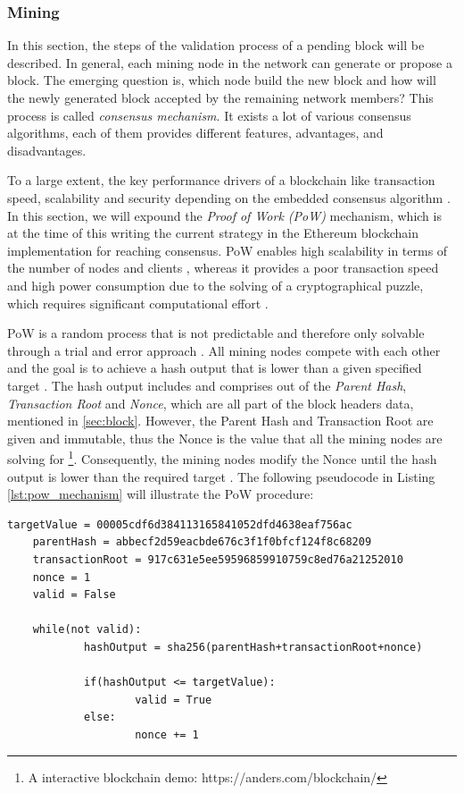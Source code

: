 \subsubsection{Mining}
\label{sec:mining}
In this section, the steps of the validation process of a pending block will be described. 
In general, each mining node in the network can generate or propose a block. 
The emerging question is, which node build the new block and how will the newly 
generated block accepted by the remaining network members? 
This process is called \textit{consensus mechanism}.
It exists a lot of various consensus algorithms, each of them provides different features,
advantages, and disadvantages. 

To a large extent, the key performance drivers of a blockchain
like transaction speed, scalability and security depending on the embedded consensus algorithm . 
In this section, we will expound the \textit{Proof of Work (PoW)} mechanism, 
which is at the time of this writing the current strategy in the Ethereum blockchain 
implementation for reaching consensus. 
PoW enables high scalability in terms of the number 
of nodes and clients , whereas it provides a poor transaction speed and high 
power consumption due to the solving of a cryptographical puzzle, which requires 
significant computational effort . 

PoW is a random process that is not predictable and therefore only solvable through a 
trial and error approach . 
All mining nodes compete with each other and the goal is to achieve a hash output that 
is lower than a given specified target .
The hash output includes and comprises out of the \textit{Parent Hash}, \textit{Transaction Root} and
\textit{Nonce}, which are all part of the block headers data, mentioned in \ref{sec:block}.
However, the Parent Hash and Transaction Root are given and immutable, thus the Nonce
is the value that all the mining nodes are solving for \footnote{A interactive blockchain demo: https://anders.com/blockchain/}.
Consequently, the mining nodes modify the Nonce until the hash output is lower than the required target .
The following pseudocode in Listing \ref{lst:pow_mechanism} will illustrate the PoW procedure:

\vspace{7mm}
\begin{lstlisting}[label={lst:pow_mechanism}, caption={Pseudocode of PoW Mechanism}]
	targetValue = 00005cdf6d384113165841052dfd4638eaf756ac
	parentHash = abbecf2d59eacbde676c3f1f0bfcf124f8c68209
	transactionRoot = 917c631e5ee59596859910759c8ed76a21252010
	nonce = 1
	valid = False

	while(not valid):
			hashOutput = sha256(parentHash+transactionRoot+nonce)
		
			if(hashOutput <= targetValue):
					valid = True
			else:
					nonce += 1

\end{lstlisting}
\clearpage

